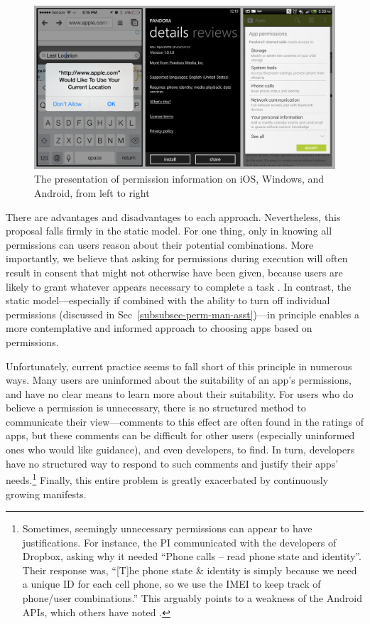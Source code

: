 \documentclass[11pt]{article}
\begin{document}
\begin{figure}[ht]
\centering
    \includegraphics[width=\linewidth]{img/OSscreenshots.png}
    \vspace{1pt}
    \caption{The presentation of permission information on iOS, Windows, 
    and Android, from left to right}
    \label{permsOSs}
\end{figure}

There are advantages and disadvantages to each approach. Nevertheless,
this proposal falls firmly in the static model. For one thing, only in 
knowing all permissions can users reason about their potential
combinations. More importantly, we believe that asking for permissions
during execution will often result in consent that might not otherwise
have been given, because users are likely to grant whatever appears
necessary to complete a task \cite{phisher-wanings-SIGCHI08}. In contrast, the static
model---especially if combined with the ability to turn off individual
permissions (discussed in Sec~\ref{subsubsec-perm-man-asst})---in 
principle enables a more contemplative and
informed approach to choosing apps based on permissions.

Unfortunately, current practice seems to fall short of this principle
in numerous ways.  Many users are uninformed about the suitability of
an app's permissions, and have no clear means to learn more about
their suitability. For users who do
believe a permission is unnecessary, there is no structured method to
communicate their view---comments to this effect are often found in
the ratings of apps, but these comments can be difficult for other
users (especially uninformed ones who would like guidance), and even
developers, to find. In turn, developers have no structured way to
respond to such comments and justify their apps'
needs.\footnote{Sometimes, seemingly unnecessary permissions can
  appear to have justifications. For instance, the PI communicated
  with the developers of Dropbox, asking why it needed ``Phone calls
  -- read phone state and identity''. Their response was, ``[T]he
  phone state \& identity is simply because we need a unique ID for
  each cell phone, so we use the IMEI to keep track of phone/user
  combinations.'' This arguably points to a weakness of the Android
  APIs, which others have noted \cite{effectivness-perms-USENIX11}.} Finally, this entire problem
is greatly exacerbated by continuously growing manifests.
\end{document}
